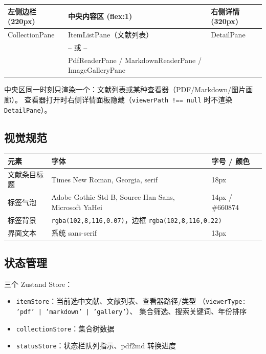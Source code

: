 \documentclass[12pt, a4paper]{article}
\begin{document}
\begin{center}
\begin{tabular}{p{2.5cm} p{2.5cm} p{2.5cm} p{3cm}}
  \toprule
  左侧边栏 (220px) & 中央内容区 (flex:1) & & 右侧详情 (320px) \\
  \midrule
  CollectionPane & \multicolumn{2}{l}{ItemListPane（文献列表）} & DetailPane \\
                 & \multicolumn{2}{l}{-- 或 --} & \\
                 & \multicolumn{2}{l}{PdfReaderPane / MarkdownReaderPane / ImageGalleryPane} & \\
  \bottomrule
\end{tabular}
\end{center}

中央区同一时刻只渲染一个：文献列表或某种查看器（PDF/Markdown/图片画廊）。
查看器打开时右侧详情面板隐藏（\texttt{viewerPath !== null} 时不渲染 \texttt{DetailPane}）。

\subsection{视觉规范}

\begin{center}
\begin{tabular}{lll}
  \toprule
  \textbf{元素} & \textbf{字体} & \textbf{字号 / 颜色} \\
  \midrule
  文献条目标题  & Times New Roman, Georgia, serif & 18px \\
  标签气泡      & Adobe Gothic Std B, Source Han Sans, Microsoft YaHei & 14px / \textcolor{tsinghuapurple}{\#660874} \\
  标签背景      & \multicolumn{2}{l}{\texttt{rgba(102,8,116,0.07)}，边框 \texttt{rgba(102,8,116,0.22)}} \\
  界面文本      & 系统 sans-serif & 13px \\
  \bottomrule
\end{tabular}
\end{center}

\subsection{状态管理}

三个 Zustand Store：

\begin{itemize}[leftmargin=2em, itemsep=2pt]
  \item \texttt{itemStore}：当前选中文献、文献列表、查看器路径/类型
        （\texttt{viewerType: 'pdf' | 'markdown' | 'gallery'}）、
        集合筛选、搜索关键词、年份排序
  \item \texttt{collectionStore}：集合树数据
  \item \texttt{statusStore}：状态栏队列指示、pdf2md 转换进度
\end{itemize}
\end{document}
